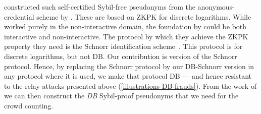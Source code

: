 \Textcite{SelfCertifiedSybilFreePseudonyms} constructed such self-certified 
Sybil-free pseudonyms from the anonymous-credential scheme by 
\textcite{HowToWinTheCloneWars}.
These are based on \ac{ZKPK} for discrete logarithms.
While \citeauthor{SelfCertifiedSybilFreePseudonyms} worked purely in the 
non-interactive domain, the foundation by \citeauthor{HowToWinTheCloneWars} 
could be both interactive and non-interactive.
The protocol by which they achieve the \ac{ZKPK} property they need is the 
Schnorr identification scheme~\cite{Schnorr}.
This protocol is  for discrete logarithms, but not \acl{DB}.
Our contribution is  version of the Schnorr protocol.
Hence, by replacing the Schnorr protocol by our DB-Schnorr version in any 
protocol where it is used, we make that protocol \acl{DB} --- and hence 
resistant to the relay attacks presented above 
(\cref{illustrations-DB-frauds}).
From the work of 
\textcite{SelfCertifiedSybilFreePseudonyms,HowToWinTheCloneWars} we can then 
construct the \emph{\acl{DB}} Sybil-proof pseudonyms that we need for the crowd 
counting.


